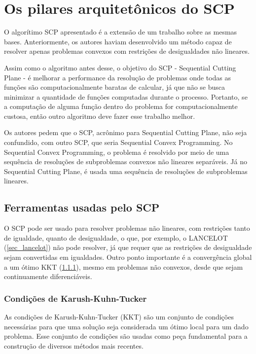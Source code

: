 \section{Os pilares arquitetônicos do SCP}

O algorítimo SCP \cite{Still2010} apresentado é a extensão de um trabalho sobre as
mesmas bases. Anteriormente, os autores haviam desenvolvido um método capaz de resolver apenas
problemas convexos com restrições de desigualdades não lineares.

Assim como o algoritmo antes desse, o objetivo do SCP - Sequential Cutting Plane - é melhorar
a performance da resolução de problemas onde todas as funções são computacionalmente baratas
de calcular, já que não se busca minimizar a quantidade de funções computadas durante o processo.
Portanto, se a computação de alguma função dentro do problema for computacionalmente custosa, então outro
algoritmo deve fazer esse trabalho melhor.

Os autores pedem que o SCP, acrônimo para Sequential Cutting Plane, não seja confundido, com
outro SCP, que seria Sequential Convex Programming. No Sequential Convex Programming, o problema é
resolvido por meio de uma sequência de resoluções de subproblemas convexos não lineares
separáveis. Já no Sequential Cutting Plane, é usada uma sequência de resoluções de subproblemas
lineares.

\subsection{Ferramentas usadas pelo SCP}
O SCP \cite{Still2010} pode ser usado para resolver problemas não lineares, com restrições tanto
de igualdade, quanto de desigualdade, o que, por exemplo, o LANCELOT (\ref{sec_lancelot}) não pode
resolver, já que requer que as restrições de desigualdade sejam convertidas em igualdades. Outro
ponto importante é a convergência global a um ótimo KKT (\ref{sec_kkt}), mesmo em problemas não convexos, desde
que sejam continuamente diferenciáveis.

\subsubsection{Condições de Karush-Kuhn-Tucker}
\label{sec_kkt}

As condições de Karush-Kuhn-Tucker (KKT) são um conjunto de condições necessárias para
que uma solução seja considerada um ótimo local para um dado problema. Esse conjunto
de condições são usadas como peça fundamental para a construção de diversos métodos mais
recentes.

